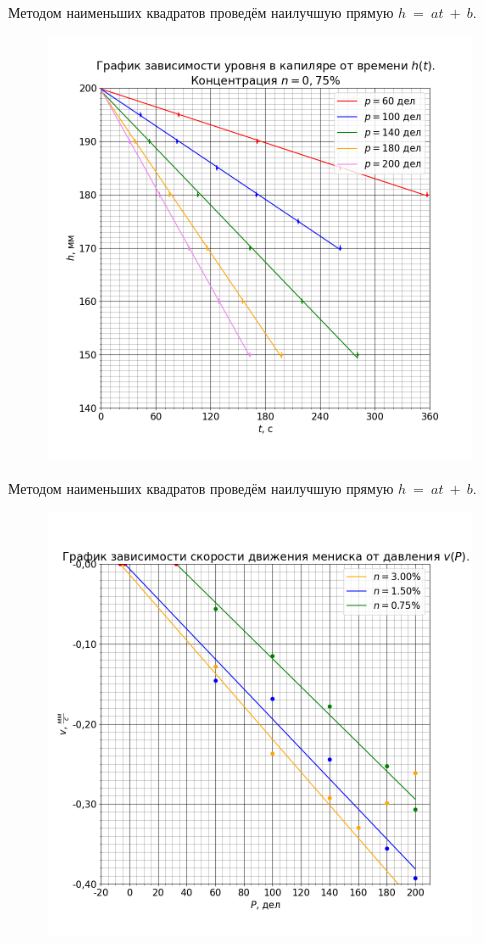 Методом наименьших квадратов проведём наилучшую прямую $h~=~at~+~b$.



\begin{figure}[H]
	\centering
	\includegraphics[width=1 \textwidth]{../plots/graph_h_t_2.png}
\end{figure}

Методом наименьших квадратов проведём наилучшую прямую $h~=~at~+~b$.



\begin{figure}[H]
	\centering
	\includegraphics[width=1 \textwidth]{../plots/graph_v_p.png}
\end{figure}

